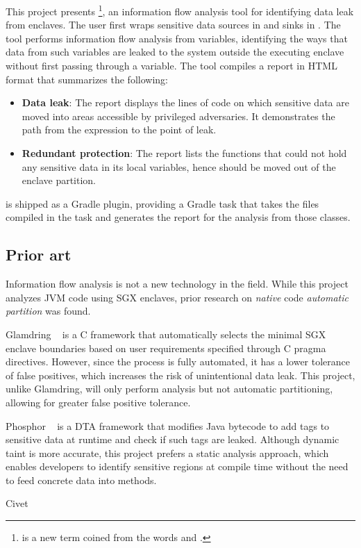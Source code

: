 This project presents \pname{}
\footnote{ is a new term coined from the words  and .},
an information flow analysis tool
for identifying data leak from enclaves.
The user first wraps sensitive data sources in  and sinks in .
The tool performs information flow analysis from  variables,
identifying the ways that data from such variables are leaked
to the system outside the executing enclave
without first passing through a  variable.
The tool compiles a report in HTML format that summarizes the following:
\begin{itemize}
	\item \textbf{Data leak}:
		The report displays the lines of code on which sensitive data are moved
		into areas accessible by privileged adversaries.
		It demonstrates the path from the  expression to the point of leak.
	\item \textbf{Redundant protection}:
		The report lists the functions that could not hold any sensitive data in its local variables,
		hence should be moved out of the enclave partition.
\end{itemize}

\pname{} is shipped as a Gradle plugin,
providing a Gradle task that
takes the  files compiled in the  task
and generates the report for the analysis from those classes.

\subsection{Prior art}\label{subsec:prior-art}
Information flow analysis is not a new technology in the field.
While this project analyzes JVM code using SGX enclaves,
prior research on \emph{native} code \emph{automatic partition} was found.

Glamdring ~\cite{glamdring} is a C framework that
automatically selects the minimal SGX enclave boundaries
based on user requirements specified through C pragma directives.
However, since the process is fully automated,
it has a lower tolerance of false positives,
which increases the risk of unintentional data leak.
This project, unlike Glamdring, will only perform analysis but not automatic partitioning,
allowing for greater false positive tolerance.

Phosphor ~\cite{BellJonathan2014Pidd} is a DTA framework
that modifies Java bytecode to add tags to sensitive data at runtime
and check if such tags are leaked.
Although dynamic taint is more accurate,
this project prefers a static analysis approach,
which enables developers to identify sensitive regions at compile time
without the need to feed concrete data into methods.

Civet ~\cite{civet} %
